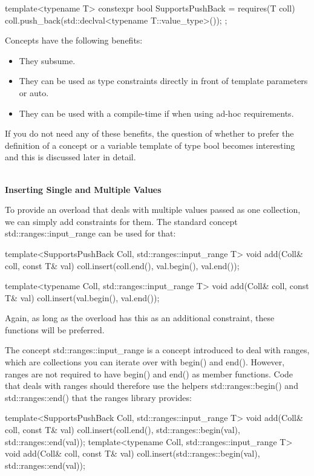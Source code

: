 \begin{cpp}
template<typename T>
constexpr bool SupportsPushBack = requires(T coll) {
	coll.push_back(std::declval<typename T::value_type>());
};
\end{cpp}

Concepts have the following benefits:

\begin{itemize}
\item
They subsume.

\item
They can be used as type constraints directly in front of template parameters or auto.

\item
They can be used with a compile-time if when using ad-hoc requirements.
\end{itemize}

If you do not need any of these benefits, the question of whether to prefer the definition of a concept or a variable template of type bool becomes interesting and this is discussed later in detail.

\noindent
\hspace*{\fill} \\ %
\textbf{Inserting Single and Multiple Values}

To provide an overload that deals with multiple values passed as one collection, we can simply add constraints for them. The standard concept std::ranges::input\_range can be used for that:

\begin{cpp}
template<SupportsPushBack Coll, std::ranges::input_range T>
void add(Coll& coll, const T& val)
{
	coll.insert(coll.end(), val.begin(), val.end());
}

template<typename Coll, std::ranges::input_range T>
void add(Coll& coll, const T& val)
{
	coll.insert(val.begin(), val.end());
}
\end{cpp}

Again, as long as the overload has this as an additional constraint, these functions will be preferred.

The concept std::ranges::input\_range is a concept introduced to deal with ranges, which are collections you can iterate over with begin() and end(). However, ranges are not required to have begin() and end() as member functions. Code that deals with ranges should therefore use the helpers std::ranges::begin() and std::ranges::end() that the ranges library provides:

\begin{cpp}
template<SupportsPushBack Coll, std::ranges::input_range T>
void add(Coll& coll, const T& val)
{
	coll.insert(coll.end(), std::ranges::begin(val), std::ranges::end(val));
}
template<typename Coll, std::ranges::input_range T>
void add(Coll& coll, const T& val)
{
	coll.insert(std::ranges::begin(val), std::ranges::end(val));
}
\end{cpp}


